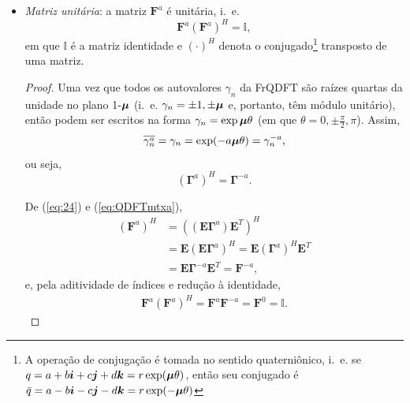 \begin{itemize}[noitemsep]
	\item \textit{Matriz unit\'aria}: a matriz $ \mathbf{F}^a $ \'e unit\'aria, i.~e.
	\begin{equation}
	\mathbf{F}^a (\mathbf{F}^a)^H = \mathbb{I},
	\end{equation}
	em que $ \mathbb{I} $ \'e a matriz identidade e $ (\cdot)^H $ denota o conjugado\footnote{A opera\c c\~ao de conjuga\c c\~ao \'e tomada no sentido quaterni\^onico, i.~e. se $ q = a + b\boldsymbol{i} + c\boldsymbol{j} + d\boldsymbol{k} = r \exp (\boldsymbol{\mu} \theta) $, ent\~ao seu conjugado \'e $ \bar{q} = a - b\boldsymbol{i} - c\boldsymbol{j} - d\boldsymbol{k} = r \exp (-\boldsymbol{\mu} \theta) $} transposto de uma matriz.
	
	\begin{proof}
		Uma vez que todos os autovalores $ \gamma_n $ da FrQDFT s\~ao ra\'izes quartas da unidade no plano 1-$\boldsymbol{\mu} $ (i.~e. $ \gamma_n = \pm 1, \pm \boldsymbol{\mu} $ e, portanto, t\^em m\'odulo unit\'ario), ent\~ao podem ser escritos na forma $ \gamma_n = \exp \boldsymbol{\mu} \theta $ (em que $ \theta = 0, \pm \frac{\pi}{2}, \pi $). Assim,
		\begin{equation}
		\overline{\gamma^a_n} = \gamma_n = \exp (-a \boldsymbol{\mu} \theta) = \gamma^{-a}_n,
		\end{equation}
		ou seja,
		\begin{equation}
		\label{eq:24}
		(\boldsymbol{\Gamma}^a)^H = \boldsymbol{\Gamma}^{-a}.
		\end{equation}
		
		De (\ref{eq:24}) e (\ref{eq:QDFTmtxa}),
		\begin{equation}
		\begin{aligned}
		(\mathbf{F}^a)^H &=  \left((\mathbf{E} \boldsymbol{\Gamma}^a) \mathbf{E}^T \right)^H \\
		&=  \mathbf{E} \left(\mathbf{E} \boldsymbol{\Gamma}^a  \right)^H =
		\mathbf{E} (\boldsymbol{\Gamma}^{a})^H \mathbf{E}^T \\
		&= \mathbf{E} \boldsymbol{\Gamma}^{-a} \mathbf{E}^T = \mathbf{F}^{-a},
		\end{aligned}
		\end{equation}
		e, pela aditividade de \'indices e redu\c c\~ao \`a identidade,
		\begin{equation}
		\begin{aligned}
		\mathbf{F}^a (\mathbf{F}^a)^H = \mathbf{F}^a \mathbf{F}^{-a} = \mathbf{F}^0= \mathbb{I}.
		\end{aligned}
		\end{equation}
	\end{proof}
\end{itemize}


